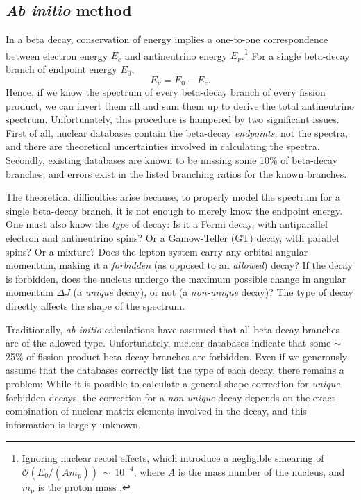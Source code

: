 \documentclass[../thesis.tex]{subfiles}
\begin{document}
\subsection{\textit{Ab initio} method}
\label{sec:abinitio}

In a beta decay, conservation of energy implies a one-to-one correspondence between electron energy $E_e$ and antineutrino energy $E_\nu$.\footnote{Ignoring nuclear recoil effects, which introduce a negligible smearing of $\mathcal{O}(E_0/(Am_p))\,\sim\,10^{-4}$, where $A$ is the mass number of the nucleus, and $m_p$ is the proton mass \cite{PhysRevC.84.024617}.} For a single beta-decay branch of endpoint energy $E_0$,
\begin{equation}
  \label{eq:reacEnuEe}
  E_\nu = E_0 - E_e.
\end{equation}
Hence, if we know the spectrum of every beta-decay branch of every fission product, we can invert them all and sum them up to derive the total antineutrino spectrum. Unfortunately, this procedure is hampered by two significant issues. First of all, nuclear databases contain the beta-decay \emph{endpoints}, not the spectra, and there are theoretical uncertainties involved in calculating the spectra. Secondly, existing databases \cite{ENSDF,JENDL} are known to be missing some 10\% of beta-decay branches, and errors exist in the listed branching ratios for the known branches.

The theoretical difficulties arise because, to properly model the spectrum for a single beta-decay branch, it is not enough to merely know the endpoint energy. One must also know the \emph{type} of decay: Is it a Fermi decay, with antiparallel electron and antineutrino spins? Or a Gamow-Teller (GT) decay, with parallel spins? Or a mixture? Does the lepton system carry any orbital angular momentum, making it a \emph{forbidden} (as opposed to an \emph{allowed}) decay? If the decay is forbidden, does the nucleus undergo the maximum possible change in angular momentum $\Delta J$ (a \emph{unique} decay), or not (a \emph{non-unique} decay)? The type of decay directly affects the shape of the spectrum.

Traditionally, \emph{ab initio} calculations have assumed that all beta-decay branches are of the allowed type. Unfortunately, nuclear databases indicate that some $\sim$25\% of fission product beta-decay branches are forbidden. Even if we generously assume that the databases correctly list the type of each decay, there remains a problem: While it is possible to calculate a general shape correction for \emph{unique} forbidden decays, the correction for a \emph{non-unique} decay depends on the exact combination of nuclear matrix elements involved in the decay, and this information is largely unknown.
\end{document}
